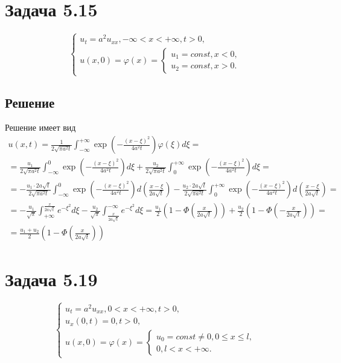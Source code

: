 \documentclass[11pt]{article}
\begin{document}
\section{Задача 5.15}
\label{sec:orgc057bdf}
\begin{equation}
\begin{cases}
u_t = a^2u_{xx}, -\infty < x < +\infty, t > 0, \\
u(x, 0) = \varphi(x) =
\begin{cases}
u_1 = const, x < 0, \\
u_2 = const, x > 0.
\end{cases}
\end{cases}
\end{equation}
\subsection{Решение}
\label{sec:orgb9b4b3a}
Решение имеет вид
\begin{multline}
u(x, t) = \frac1{2\sqrt{\pi a^2t}}\int_{-\infty}^{+\infty}\exp\left(-\frac{(x - \xi)^2}{4a^2t}\right)\varphi(\xi)d\xi = \\
= \frac{u_1}{2\sqrt{\pi a^2t}}\int_{-\infty}^0\exp\left(-\frac{(x - \xi)^2}{4a^2t}\right)d\xi +
\frac{u_2}{2\sqrt{\pi a^2t}}\int_0^{+\infty}\exp\left(-\frac{(x - \xi)^2}{4a^2t}\right)d\xi = \\
= -\frac{u_1\cdot2a\sqrt{t}}{2\sqrt{\pi a^2t}}\int_{-\infty}^0\exp\left(-\frac{(x - \xi)^2}{4a^2t}\right)d\left(\frac{x - \xi}{2a\sqrt{t}}\right) -
\frac{u_2\cdot2a\sqrt{t}}{2\sqrt{\pi a^2t}}\int_0^{+\infty}\exp\left(-\frac{(x - \xi)^2}{4a^2t}\right)d\left(\frac{x - \xi}{2a\sqrt{t}}\right) = \\
= -\frac{u_1}{\sqrt{\pi}}\int_{+\infty}^{\frac{x}{2a\sqrt{t}}}e^{-\xi^2}d\xi - \frac{u_2}{\sqrt{\pi}}\int_{\frac{x}{2a\sqrt{t}}}^{-\infty}e^{-\xi^2}d\xi =
\frac{u_1}2\left(1 - \Phi\left(\frac{x}{2a\sqrt{t}}\right)\right) + \frac{u_2}2\left(1 - \Phi\left(-\frac{x}{2a\sqrt{t}}\right)\right) = \\
= \frac{u_1 + u_2}2\left(1 - \Phi\left(\frac{x}{2a\sqrt{t}}\right)\right)
\end{multline}
\section{Задача 5.19}
\label{sec:org5995f42}
\begin{equation}
\begin{cases}
u_t = a^2u_{xx}, 0 < x < +\infty, t > 0, \\
u_x(0, t) = 0, t > 0, \\
u(x, 0) = \varphi(x) =
\begin{cases}
u_0 = const \neq 0, 0 \leq x \leq l, \\
0, l < x < +\infty.
\end{cases}
\end{cases}
\end{equation}
\end{document}
